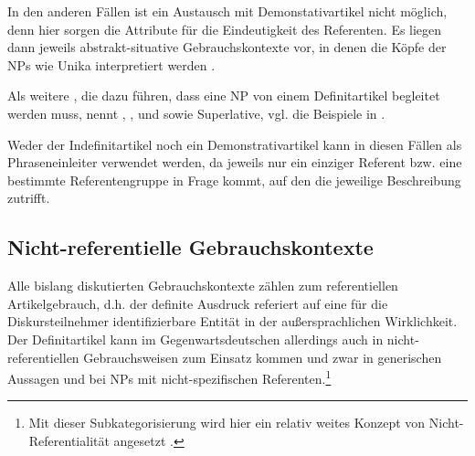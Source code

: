 \begin{exe}
	\ex \label{ex:bill}  
\end{exe}

In den anderen Fällen ist ein Austausch mit Demonstativartikel nicht möglich, denn hier sorgen die Attribute für die Eindeutigkeit des Referenten. Es liegen dann jeweils abstrakt-situative Gebrauchskontexte vor, in denen die Köpfe der NPs wie Unika interpretiert werden  \parencite[38]{Himmelmann1997}. 

Als weitere , die dazu führen, dass eine NP von einem Definitartikel begleitet werden muss, nennt  \textcite[148,228ff.]{Hawkins1978} , ,  und  sowie Superlative, vgl. die Beispiele in  \parencite[vgl. auch][9]{Lyons1999}.

 \begin{exe}
	\ex \label{ex:mod}   
	\begin{xlist}
		\ex \label{ex:same} 
		\ex \label{ex:only}    
		\ex \label{ex:next}  
		\ex \label{ex:first}   
		\ex \label{ex:super} 
		\end{xlist}
\end{exe}

Weder der Indefinitartikel noch ein Demonstrativartikel kann in diesen Fällen als Phraseneinleiter verwendet werden, da jeweils nur ein einziger Referent bzw. eine bestimmte Referentengruppe in Frage kommt, auf den die jeweilige Beschreibung zutrifft.  

\subsection{Nicht-referentielle Gebrauchskontexte}\label{sec:nicht-referentiell}

Alle bislang diskutierten Gebrauchskontexte zählen zum referentiellen Artikelgebrauch, d.h. der definite Ausdruck referiert auf eine für die Diskursteilnehmer identifizierbare Entität in der außersprachlichen Wirklichkeit.
Der Definitartikel kann im Gegenwartsdeutschen allerdings auch in nicht-referentiellen Gebrauchsweisen zum Einsatz kommen und zwar in generischen Aussagen und bei NPs mit nicht-spezifischen Referenten.\footnote{Mit dieser Subkategorisierung wird hier ein relativ weites Konzept von Nicht-Referentialität  angesetzt \parencite[zur Abgrenzungsdiskussion von Definitheit, Spezifizität und Referentialität vgl. u.a.][]{Bisle-Muller1991,Lyons1999,Studler2011,vonHeusinger2011}.} 

